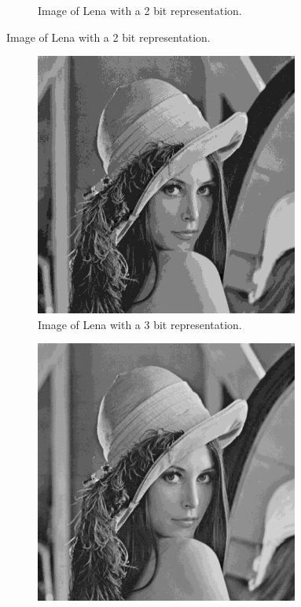 \documentclass{article}
\theoremstyle{problemstyle}
\begin{document}
\begin{problem}
\begin{figure}[H]
\begin{subfigure}{.45\textwidth}
		\caption{Image of Lena with a 2 bit representation.}
		\label{fig:lena_b2}
	\end{subfigure}
\end{figure}
\begin{figure}[H]
	\begin{subfigure}{.45\textwidth}
		\centering
		\includegraphics[width=0.95\textwidth]{lena_b3.png}
		\caption{Image of Lena with a 3 bit representation.}
		\label{fig:lena_b3}
	\end{subfigure}
	\hfill
	\begin{subfigure}{.45\textwidth}
		\centering
		\includegraphics[width=0.95\textwidth]{lena_b4.png}

\end{subfigure}
\end{figure}
\end{problem}
\end{document}
